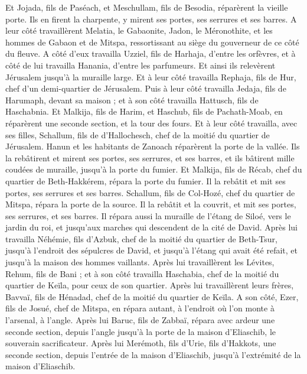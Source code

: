 \begin{multicols}{2}
Et Jojada, fils de Paséach, et Meschullam, fils de Besodia, réparèrent la vieille porte. Ils en firent la charpente, y mirent ses portes, ses serrures et ses barres.
A leur côté travaillèrent Melatia, le Gabaonite, Jadon, le Méronothite, et les hommes de Gabaon et de Mitspa, ressortissant au siège du gouverneur de ce côté du fleuve.
A côté d’eux travailla Uzziel, fils de Harhaja, d’entre les orfèvres, et à côté de lui travailla Hanania, d'entre les parfumeurs. Et ainsi ils relevèrent Jérusalem jusqu'à la muraille large.
Et à leur côté travailla Rephaja, fils de Hur, chef d'un demi-quartier de Jérusalem.
Puis à leur côté travailla Jedaja, fils de Harumaph, devant sa maison ; et à son côté travailla Hattusch, fils de Haschabnia.
Et Malkija, fils de Harim, et Haschub, fils de Pachath-Moab, en réparèrent une seconde section, et la tour des fours.
Et à leur côté travailla, avec ses filles, Schallum, fils de d'Hallochesch, chef de la moitié du quartier de Jérusalem.
Hanun et les habitants de Zanoach réparèrent la porte de la vallée. Ils la rebâtirent et mirent ses portes, ses serrures, et ses barres, et ils bâtirent mille coudées de muraille, jusqu'à la porte du fumier.
Et Malkija, fils de Récab, chef du quartier de Beth-Hakkérem, répara la porte du fumier. Il la rebâtit et mit ses portes, ses serrures et ses barres.
Schallum, fils de Col-Hozé, chef du quartier de Mitspa, répara la porte de la source. Il la rebâtit et la couvrit, et mit ses portes, ses serrures, et ses barres. Il répara aussi la muraille de l'étang de Siloé, vers le jardin du roi, et jusqu'aux marches qui descendent de la cité de David.
Après lui travailla Néhémie, fils d'Azbuk, chef de la moitié du quartier de Beth-Tsur, jusqu'à l'endroit des sépulcres de David, et jusqu'à l'étang qui avait été refait, et jusqu'à la maison des hommes vaillants.
Après lui travaillèrent les Lévites, Rehum, fils de Bani ; et à son côté travailla Haschabia, chef de la moitié du quartier de Keïla, pour ceux de son quartier.
Après lui travaillèrent leurs frères, Bavvaï, fils de Hénadad, chef de la moitié du quartier de Keïla.
A son côté, Ezer, fils de Josué, chef de Mitspa, en répara autant, à l'endroit où l'on monte à l'arsenal, à l'angle.
Après lui Baruc, fils de Zabbaï, répara avec ardeur une seconde section, depuis l'angle jusqu'à la porte de la maison d'Eliaschib, le souverain sacrificateur.
Après lui Merémoth, fils d'Urie, fils d'Hakkots, une seconde section, depuis l'entrée de la maison d'Eliaschib, jusqu'à l'extrémité de la maison d'Eliaschib.

\end{multicols}
